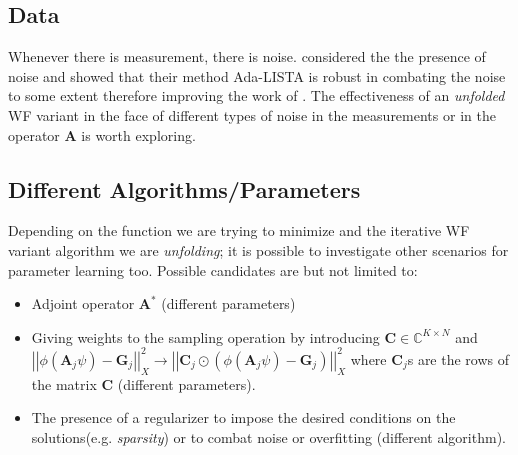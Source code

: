 \subsection*{Data}

Whenever there is measurement, there is noise. \cite{Aberdam2020} considered the the presence of noise and showed that 
their method \ac{Ada-LISTA} is robust in combating the noise to some extent therefore improving the work of \cite{Gregor2010}.
The effectiveness of an \emph{unfolded} \ac{WF} variant in the face of different types of noise in the measurements or in the operator $\boldsymbol{A}$ 
is worth exploring. 


\subsection*{Different Algorithms/Parameters}

Depending on the function we are trying to minimize and the iterative \ac{WF}\cite{Jaganathan2015}\cite{Liu2019} variant algorithm we are
 \emph{unfolding}; it is possible to investigate other scenarios for parameter learning too. Possible candidates are but not limited to:
\begin{itemize}
  \item Adjoint operator $\boldsymbol{A}^*$ (different parameters)
  \item Giving weights to the sampling operation by introducing $\boldsymbol{C}\in \mathbb{C}^{K\times N}$ and 
  $\left|\left|\phi(\boldsymbol{A}_j\psi)-\boldsymbol{G}_j\right|\right|_X^2 \rightarrow \left|\left|\boldsymbol{C}_j \odot \left(\phi(\boldsymbol{A}_j\psi)-\boldsymbol{G}_j\right)\right|\right|_X^2$ 
  where $\boldsymbol{C}_j$s are the rows of the matrix $\boldsymbol{C}$ (different parameters).
  \item The presence of a regularizer to impose the desired conditions on the solutions(e.g. \emph{sparsity}) or to combat noise or overfitting (different algorithm).
\end{itemize}















